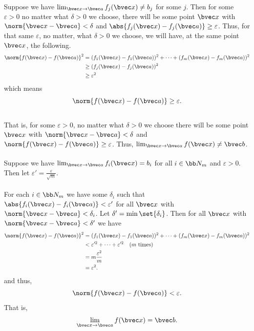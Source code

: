 \documentclass[12pt, letterpaper]{hmcpset}
\begin{document}
\begin{solution}
	Suppose we have $\lim_{\bvec x \to \bvec a} f_j(\bvec x) \neq b_j$ for some $j$. Then for some $\varepsilon > 0$ no matter what $\delta > 0$ we choose, there will be some point $\bvec x$ with $\norm{\bvec x - \bvec a} < \delta$ and ${\abs{f_j(\bvec x) - f_j(\bvec a)} \ge \varepsilon}$. Thus, for that same $\varepsilon$, no matter, what $\delta > 0$ we choose, we will have, at the same point $\bvec x$, the following.
	\[
		\begin{split}
			\norm{f(\bvec x) - f(\bvec a)}^2 & = (f_1(\bvec x) - f_1(\bvec a))^2 + \cdots + (f_m(\bvec x) - f_m(\bvec a))^2 \\
							 & \ge (f_j(\bvec x) - f_j(\bvec a))^2 \\
							 & \ge \varepsilon^2
		\end{split}
	\]
	which means
	\[
		\norm{f(\bvec x) - f(\bvec a)} \ge \varepsilon.
	\]\\
	That is, for some $\varepsilon > 0$, no matter what $\delta > 0$ we choose there will be some point $\bvec x$ with $\norm{\bvec x - \bvec a} < \delta$ and $\norm{f(\bvec x) - f(\bvec a)} \ge \varepsilon$. Thus, $\lim_{\bvec x \to \bvec a} f(\bvec x) \neq \bvec b$.\\\\
	Suppose we have $\lim_{\bvec x \to \bvec a} f_i(\bvec x) = b_i$ for all $i \in \bb N_m$ and $\varepsilon > 0$. Then let $\varepsilon' = \frac{\varepsilon}{\sqrt m}$.\\\\
	For each $i \in \bb N_m$ we have some $\delta_i$ such that $\abs{f_i(\bvec x) - f_i(\bvec a)} < \varepsilon'$ for all $\bvec x$ with $\norm{\bvec x - \bvec a} < \delta_i$. Let $ \delta' = \min \set{\delta_i}$. Then for all $\bvec x$ with $\norm{\bvec x - \bvec a} < \delta'$ we have
	\[
		\begin{split}
			\norm{f(\bvec x) - f(\bvec a)}^2 & = (f_1(\bvec x) - f_1(\bvec a))^2 + \cdots + (f_m(\bvec x) - f_m(\bvec a))^2 \\
						       & < \varepsilon'^2 + \cdots + \varepsilon'^2 \quad \text{($m$ times)} \\
						       & = m \frac{\varepsilon^2}{m} \\
						       & = \varepsilon^2.
		\end{split}
	\]
	and thus,
	\[
		\norm{f(\bvec x) - f(\bvec a)} < \varepsilon.
	\]
	That is,
	\[
		\lim_{\bvec x \to \bvec a} f(\bvec x) = \bvec b.
	\]
\end{solution}
\end{document}
